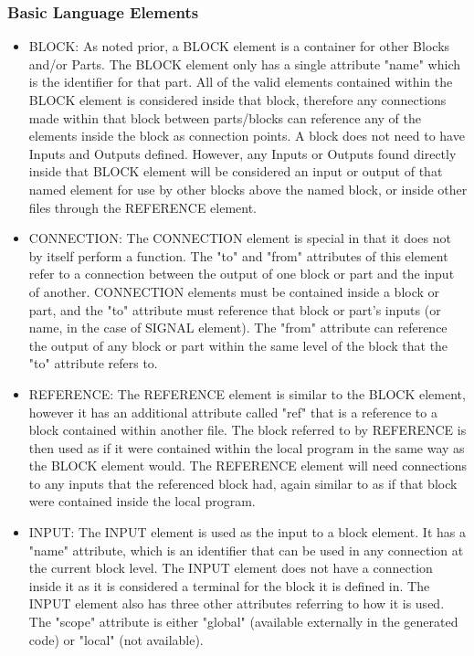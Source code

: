 \documentclass[titlepage]{article}
\begin{document}
\subsubsection{Basic Language Elements}
\begin{itemize}[label={}]
    \item BLOCK:
As noted prior, a BLOCK element is a container for other Blocks and/or Parts.
The BLOCK element only has a single attribute "name" which is the identifier for that part.
All of the valid elements contained within the BLOCK element is considered inside that block, therefore any connections made within that block between parts/blocks can reference any of the elements inside the block as connection points. A block does not need to have Inputs and Outputs defined. However, any Inputs or Outputs found directly inside that BLOCK element will be considered an input or output of that named element for use by other blocks above the named block, or inside other files through the REFERENCE element.
    \item CONNECTION:
The CONNECTION element is special in that it does not by itself perform a function.
The "to" and "from" attributes of this element refer to a connection between the output of one block or part and the input of another.
CONNECTION elements must be contained inside a block or part, and the "to" attribute must reference that block or part's inputs (or name, in the case of SIGNAL element).
The "from" attribute can reference the output of any block or part within the same level of the block that the "to" attribute refers to.
    \item REFERENCE:
The REFERENCE element is similar to the BLOCK element, however it has an additional attribute called "ref" that is a reference to a block contained within another file.
The block referred to by REFERENCE is then used as if it were contained within the local program in the same way as the BLOCK element would.
The REFERENCE element will need connections to any inputs that the referenced block had, again similar to as if that block were contained inside the local program.
    \item INPUT:
The INPUT element is used as the input to a block element.
It has a "name" attribute, which is an identifier that can be used in any connection at the current block level.
The INPUT element does not have a connection inside it as it is considered a terminal for the block it is defined in.
The INPUT element also has three other attributes referring to how it is used.
The "scope" attribute is either "global" (available externally in the generated code) or "local" (not available).

\end{itemize}
\end{document}
